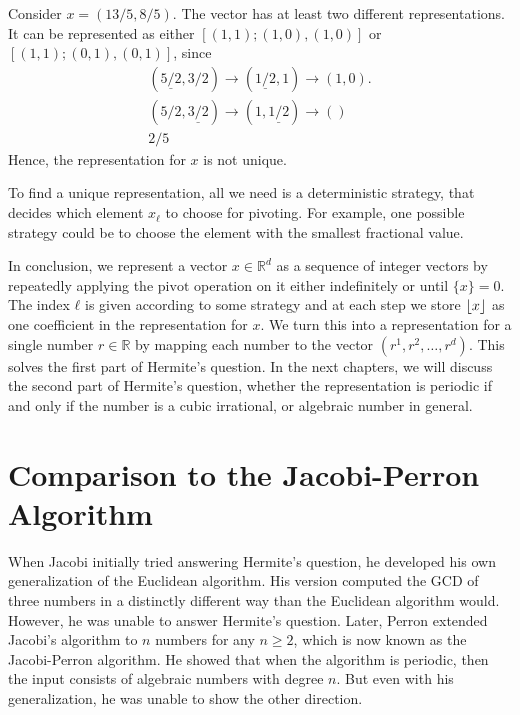 
\begin{example}
  Consider $x = (13/5, 8/5)$.
  The vector has at least two different representations.
  It can be represented as either $[(1,1); (1, 0), (1, 0)]$ or $[(1,1); (0, 1), (0, 1)]$,
  since
  \begin{align*}
    (\underline{5/2}, 3/2) → (\underline{1/2}, 1) → (1, 0). \\
    (5/2, \underline{3/2}) → (1, \underline{1/2}) → () \\
    2/5
  \end{align*}
  Hence, the representation for $x$ is not unique.
\end{example}

To find a unique representation, all we need is a deterministic strategy,
that decides which element $x_ℓ$ to choose for pivoting.
For example, one possible strategy could be to choose the element with the
smallest fractional value.

In conclusion,
we represent a vector $x ∈ ℝ^d$ as a sequence of integer vectors by repeatedly
applying the $\mathrm{pivot}$ operation on it either indefinitely or until
$\{x\} = 0$.
The index $ℓ$ is given according to some strategy and at each step we store
$\left\lfloor x\right\rfloor$ as one coefficient in the representation for $x$.
We turn this into a representation for a single number $r ∈ ℝ$ by mapping each
number to the vector $(r^1, r^2, …, r^d)$.
This solves the first part of Hermite's question.
In the next chapters, we will discuss the second part of Hermite's question,
whether the representation is periodic if and only if the number is a cubic
irrational, or algebraic number in general.

\iffalse
\section{Comparison to the Jacobi-Perron Algorithm}

When Jacobi \cite{Jacobi68} initially tried answering Hermite's question,
he developed his own generalization of the Euclidean algorithm.
His version computed the GCD of three numbers in a distinctly different way
than the Euclidean algorithm would.
However, he was unable to answer Hermite's question.
Later, Perron \cite{Perron07} extended Jacobi's algorithm to $n$ numbers for any $n ≥ 2$,
which is now known as the Jacobi-Perron algorithm.
He showed that when the algorithm is periodic, then the input consists of
algebraic numbers with degree $n$.
But even with his generalization, he was unable to show the other direction.

